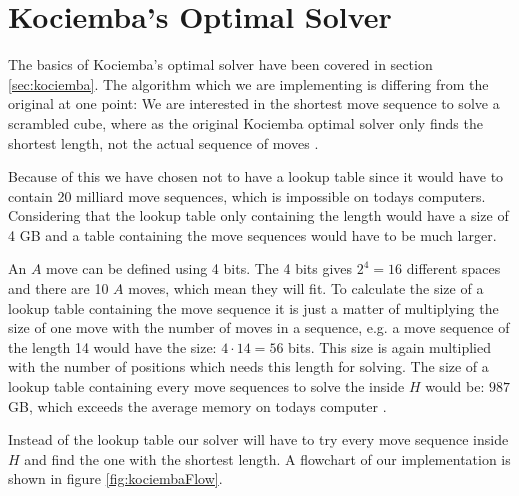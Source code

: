 \chapter{Kociemba's Optimal Solver}
\label{chap:kociembaImplement}
The basics of Kociemba's optimal solver have been covered in section \ref{sec:kociemba}. The algorithm which we are implementing is differing from the original at one point:
We are interested in the shortest move sequence to solve a scrambled cube, where as the original Kociemba optimal solver only finds the shortest length, not the actual sequence of moves \cite{rokicki09}.

Because of this we have chosen not to have a lookup table since it would have to contain 20 milliard move sequences, which is impossible on todays computers. Considering that the lookup table only containing the length would have a size of 4 GB \cite{cubeExplorer} and a table containing the move sequences would have to be much larger.

An $A$ move can be defined using 4 bits.
The 4 bits gives $2^4=16$ different spaces and there are 10 $A$ moves, which mean they will fit.
To calculate the size of a lookup table containing the move sequence it is just a matter of multiplying the size of one move with the number of moves in a sequence, e.g. a move sequence of the length 14 would have the size: $4 \cdot 14 = 56$ bits.
This size is again multiplied with the number of positions which needs this length for solving.
The size of a lookup table containing every move sequences to solve the \rubik{} inside $H$ would be: $987$ GB, which exceeds the average memory on todays computer \cite{averageRAM} \cite{maxRAM2}.

Instead of the lookup table our solver will have to try every move sequence inside $H$ and find the one with the shortest length. A flowchart of our implementation is shown in figure \ref{fig:kociembaFlow}.

